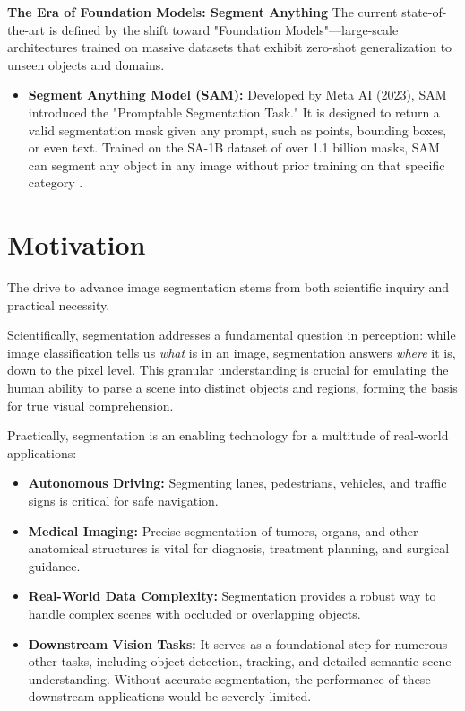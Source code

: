 \textbf{The Era of Foundation Models: Segment Anything}
The current state-of-the-art is defined by the shift toward "Foundation Models"—large-scale architectures trained on massive datasets that exhibit zero-shot generalization to unseen objects and domains.
\begin{itemize}
	\item \textbf{Segment Anything Model (SAM):} Developed by Meta AI (2023), SAM introduced the "Promptable Segmentation Task." It is designed to return a valid segmentation mask given any prompt, such as points, bounding boxes, or even text. Trained on the SA-1B dataset of over 1.1 billion masks, SAM can segment any object in any image without prior training on that specific category \cite{kirillov2023segment}.
\end{itemize}

\section{Motivation}
The drive to advance image segmentation stems from both scientific inquiry and practical necessity.

Scientifically, segmentation addresses a fundamental question in perception: while image classification tells us \textit{what} is in an image, segmentation answers \textit{where} it is, down to the pixel level. This granular understanding is crucial for emulating the human ability to parse a scene into distinct objects and regions, forming the basis for true visual comprehension.

Practically, segmentation is an enabling technology for a multitude of real-world applications:
\begin{itemize}
	\item \textbf{Autonomous Driving:} Segmenting lanes, pedestrians, vehicles, and traffic signs is critical for safe navigation.
	\item \textbf{Medical Imaging:} Precise segmentation of tumors, organs, and other anatomical structures is vital for diagnosis, treatment planning, and surgical guidance.
	\item \textbf{Real-World Data Complexity:} Segmentation provides a robust way to handle complex scenes with occluded or overlapping objects.
	\item \textbf{Downstream Vision Tasks:} It serves as a foundational step for numerous other tasks, including object detection, tracking, and detailed semantic scene understanding. Without accurate segmentation, the performance of these downstream applications would be severely limited.
\end{itemize}

